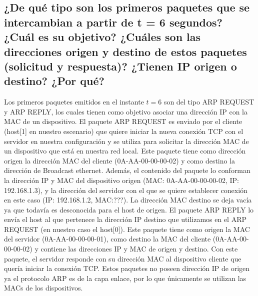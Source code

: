 \subsection{¿De qué tipo son los primeros paquetes que se intercambian a partir de t = 6 segundos? ¿Cuál es su objetivo? ¿Cuáles son las direcciones origen y destino de estos paquetes (solicitud y respuesta)? ¿Tienen IP origen o destino? ¿Por qué?}
\begin{flushleft}
Los primeros paquetes emitidos en el instante \(t=6\) son del tipo ARP REQUEST y ARP REPLY, los cuales tienen como objetivo asociar una dirección IP con la MAC de un dispositivo.
El paquete ARP REQUEST es enviado por el cliente (host[1] en nuestro escenario) que quiere iniciar la nueva conexión TCP con el servidor en nuestra configuración y se utiliza para solicitar la dirección MAC de un dispositivo que está en nuestra red local. Este paquete tiene como dirección origen la dirección MAC del cliente (0A-AA-00-00-00-02) y como destino la dirección de Broadcast ethernet. Además, el contenido del paquete lo conforman la dirección IP y MAC del dispositivo origen (MAC: 0A-AA-00-00-00-02, IP: 192.168.1.3), y la dirección del servidor con el que se quiere establecer conexión en este caso (IP: 192.168.1.2, MAC:???). La dirección MAC destino se deja vacía ya que todavía es desconocida para el host de origen.
El paquete ARP REPLY lo envía el host al que pertenece la dirección IP destino que utilizamos en el ARP REQUEST (en nuestro caso el host[0]). Este paquete tiene como origen la MAC del servidor (0A-AA-00-00-00-01), como destino la MAC del cliente (0A-AA-00-00-00-02) y contiene las direcciones IP y MAC de origen y destino. Con este paquete, el servidor responde con su dirección MAC al dispositivo cliente que quería iniciar la conexión TCP. 
Estos paquetes no poseen dirección IP de origen ya el protocolo ARP es de la capa enlace, por lo que únicamente se utilizan las MACs de los dispositivos.
\end{flushleft}

